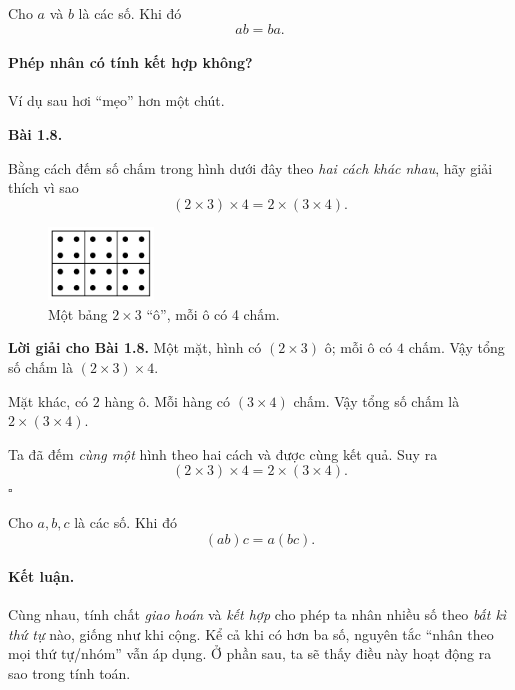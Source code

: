 \documentclass[14pt,a4paper]{extbook}
\newenvironment{problem}[1][]{
  \par\noindent\textbf{Bài #1.}\ \ignorespaces
}{\par}
\begin{document}
\begin{tcolorbox}[colback=yellow!10, colframe=orange!80!black,
title={Quan trọng: Phép nhân có tính \emph{giao hoán}}]
Cho \(a\) và \(b\) là các số. Khi đó
\[
ab = ba.
\]
\end{tcolorbox}

\paragraph{Phép nhân có tính kết hợp không?}
Ví dụ sau hơi “mẹo” hơn một chút.

\begin{problem}[1.8]
Bằng cách đếm số chấm trong hình dưới đây theo \emph{hai cách khác nhau},
hãy giải thích vì sao
\[
(2\times3)\times4 = 2\times(3\times4).
\]

\begin{figure}[h!]
  \centering
  \includegraphics[width=0.25\textwidth]{img/fig-prob1.8.pdf}
  \caption*{\small Một bảng \(2\times3\) “ô”, mỗi ô có 4 chấm.}
\end{figure}
\end{problem}

\noindent\textbf{Lời giải cho Bài 1.8.}
Một mặt, hình có \((2\times3)\) ô; mỗi ô có \(4\) chấm. Vậy tổng số chấm là
\((2\times3)\times4\).

Mặt khác, có \(2\) hàng ô. Mỗi hàng có \((3\times4)\) chấm. Vậy tổng số chấm là
\(2\times(3\times4)\).

Ta đã đếm \emph{cùng một} hình theo hai cách và được cùng kết quả. Suy ra
\[
(2\times3)\times4 = 2\times(3\times4).
\]
\(\square\)

\begin{tcolorbox}[colback=yellow!10, colframe=orange!80!black,
title={Quan trọng: Phép nhân có tính \emph{kết hợp}}]
Cho \(a,b,c\) là các số. Khi đó
\[
(ab)c = a(bc).
\]
\end{tcolorbox}

\paragraph{Kết luận.}
Cùng nhau, tính chất \emph{giao hoán} và \emph{kết hợp} cho phép ta nhân
nhiều số theo \emph{bất kì thứ tự} nào, giống như khi cộng. Kể cả khi có
hơn ba số, nguyên tắc “nhân theo mọi thứ tự/nhóm” vẫn áp dụng. Ở phần sau,
ta sẽ thấy điều này hoạt động ra sao trong tính toán.
\end{document}

